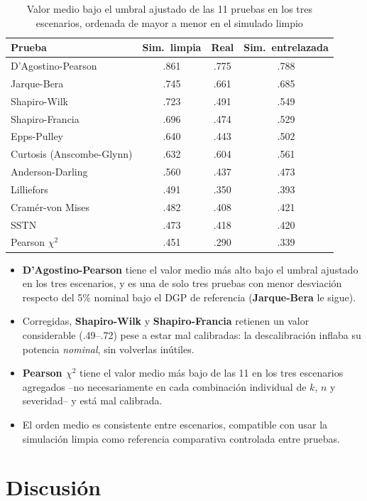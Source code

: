 \documentclass[man,mask,donotrepeattitle,floatsintext]{apa7}
\begin{document}
\begin{table}[H]
\small
\caption{Valor medio bajo el umbral ajustado de las 11 pruebas en los tres escenarios, ordenada de mayor a menor en el simulado limpio}
\label{tab:ranking}
\begin{tabular}{lccc}
\toprule
Prueba & Sim.\ limpia & Real & Sim.\ entrelazada \\
\midrule
D'Agostino-Pearson & .861 & .775 & .788 \\
Jarque-Bera & .745 & .661 & .685 \\
Shapiro-Wilk & .723 & .491 & .549 \\
Shapiro-Francia & .696 & .474 & .529 \\
Epps-Pulley & .640 & .443 & .502 \\
Curtosis (Anscombe-Glynn) & .632 & .604 & .561 \\
Anderson-Darling & .560 & .437 & .473 \\
Lilliefors & .491 & .350 & .393 \\
Cramér-von Mises & .482 & .408 & .421 \\
SSTN & .473 & .418 & .420 \\
Pearson $\chi^2$ & .451 & .290 & .339 \\
\bottomrule
\end{tabular}
\end{table}

\begin{itemize}
\item \textbf{D'Agostino-Pearson} tiene el valor medio más alto bajo el umbral ajustado en los tres escenarios, y es una de solo tres pruebas con menor desviación respecto del 5\% nominal bajo el DGP de referencia (\textbf{Jarque-Bera} le sigue).
\item Corregidas, \textbf{Shapiro-Wilk} y \textbf{Shapiro-Francia} retienen un valor considerable (.49--.72) pese a estar mal calibradas: la descalibración inflaba su potencia \emph{nominal}, sin volverlas inútiles.
\item \textbf{Pearson $\chi^2$} tiene el valor medio más bajo de las 11 en los tres escenarios agregados --no necesariamente en cada combinación individual de $k$, $n$ y severidad-- y está mal calibrada.
\item El orden medio es consistente entre escenarios, compatible con usar la simulación limpia como referencia comparativa controlada entre pruebas.
\end{itemize}

\section{Discusión}
\label{sec:discussion}
\end{document}
